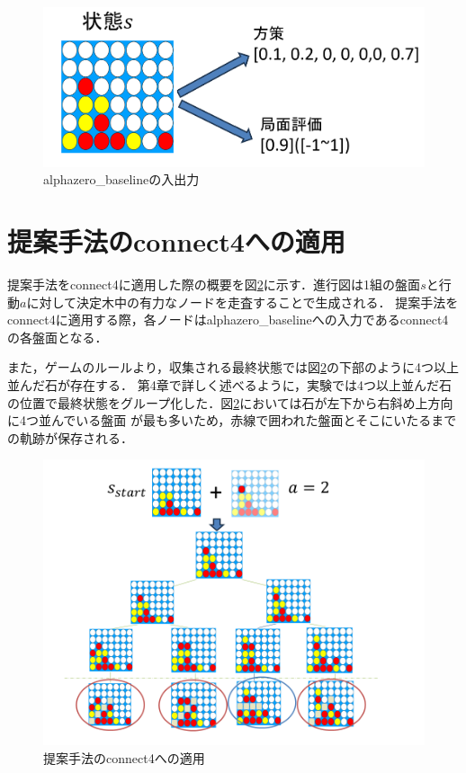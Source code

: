 \begin{figure}[htbp]
    \centering
    \includegraphics[trim={0cm 0cm 0cm 0cm},clip]{./figure/baseline.png}

    \caption{alphazero\_baselineの入出力}
    \label{fig:baseline}
\end{figure}
\section{提案手法のconnect4への適用}
提案手法をconnect4に適用した際の概要を図\ref{fig:application}に示す．進行図は1組の盤面$s$と行動$a$に対して決定木中の有力なノードを走査することで生成される．
提案手法をconnect4に適用する際，各ノードはalphazero\_baselineへの入力であるconnect4の各盤面となる．

また，ゲームのルールより，収集される最終状態では図\ref{fig:application}の下部のように4つ以上並んだ石が存在する．
第4章で詳しく述べるように，実験では4つ以上並んだ石の位置で最終状態をグループ化した．図\ref{fig:application}においては石が左下から右斜め上方向に4つ並んでいる盤面
が最も多いため，赤線で囲われた盤面とそこにいたるまでの軌跡が保存される．
\begin{figure}[htbp]
	\centering
	\includegraphics[width=\linewidth]{./figure/application.png}
	\caption{提案手法のconnect4への適用}
	\label{fig:application}
\end{figure}

